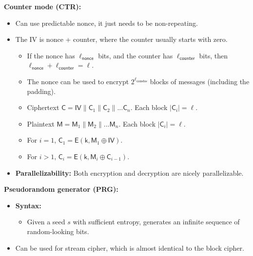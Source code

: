 \documentclass{article}
\newcommand{\msf}[1]{\mathsf{#1}}
\newcommand{\parhead}[1]{\noindent \textbf{#1}}
\begin{document}
\parhead{Counter mode (CTR):}
\begin{itemize}
    \item Can use predictable nonce, it just needs to be non-repeating.
    
    \item The IV is nonce + counter, where the counter usually starts with zero.
    \begin{itemize}
        \item If the nonce has $\ell_\msf{nonce}$ bits, and the counter has $\ell_\msf{counter}$ bits, then $\ell_\msf{nonce}+\ell_\msf{counter}=\ell$. 
        
        \item The nonce can be used to encrypt $2^{\ell_\msf{counter}}$ blocks of messages (including the padding).

        \item Ciphertext $\msf{C}=\msf{IV}\parallel\msf{C}_1\parallel\msf{C}_2\parallel...\msf{C}_n$. Each block $|\msf{C}_i|=\ell$.
        
        \item Plaintext $\msf{M}=\msf{M}_1\parallel\msf{M}_2\parallel...\msf{M}_n$. Each block $|\msf{C}_i|=\ell$.
        
        \item For $i=1$, $\msf{C}_1=\msf{E}(\msf{k},\msf{M}_1\oplus\msf{IV})$.
        
        \item For $i>1$, $\msf{C}_i=\msf{E}(\msf{k},\msf{M}_i\oplus \msf{C}_{i-1})$.
    \end{itemize}
    
    \item {\bf Parallelizability:} Both encryption and decryption are nicely parallelizable.
\end{itemize}

\parhead{Pseudorandom generator (PRG):}
\begin{itemize}
    \item {\bf Syntax:}
    \begin{itemize}
        \item Given a seed $s$ with sufficient entropy, generates an infinite sequence of random-looking bits.
    \end{itemize}
    
    \item Can be used for stream cipher, which is almost identical to the block cipher.
\end{itemize}
\end{document}
